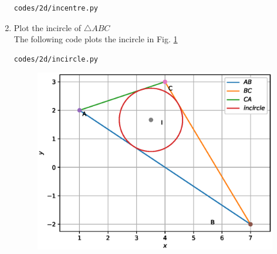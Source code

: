 \begin{enumerate}[label=\arabic*.,ref=\thesubsection.\theenumi]
\begin{lstlisting}
codes/2d/incentre.py
\end{lstlisting}
\item Plot the incircle of $\triangle ABC$
\\
\solution The following code plots the incircle in Fig. \ref{fig:incircle}
\begin{lstlisting}
codes/2d/incircle.py
\end{lstlisting}
\begin{figure}
\centering
\includegraphics[width=\columnwidth]{./circle/figs/incircle.eps}
\caption{}
\label{fig:incircle}
\end{figure}

\end{enumerate}


